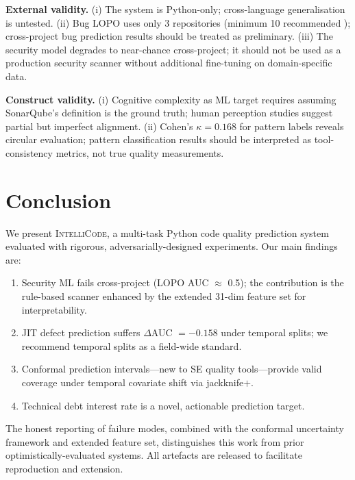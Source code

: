 \documentclass[conference]{IEEEtran}
\begin{document}
\textbf{External validity.}
(i) The system is Python-only; cross-language generalisation is untested.
(ii) Bug LOPO uses only 3 repositories (minimum 10 recommended \cite{peters2013});
cross-project bug prediction results should be treated as preliminary.
(iii) The security model degrades to near-chance cross-project; it should
not be used as a production security scanner without additional fine-tuning
on domain-specific data.

\textbf{Construct validity.}
(i) Cognitive complexity as ML target requires assuming SonarQube's definition
is the ground truth; human perception studies \cite{scalabrino2017} suggest
partial but imperfect alignment.
(ii) Cohen's $\kappa = 0.168$ for pattern labels reveals circular evaluation;
pattern classification results should be interpreted as tool-consistency
metrics, not true quality measurements.

\section{Conclusion}
\label{sec:conclusion}

We present \textsc{IntelliCode}, a multi-task Python code quality prediction
system evaluated with rigorous, adversarially-designed experiments.
Our main findings are:
\begin{enumerate}
  \item Security ML fails cross-project (LOPO AUC $\approx$ 0.5); the
    contribution is the rule-based scanner enhanced by the extended 31-dim
    feature set for interpretability.
  \item JIT defect prediction suffers $\Delta$AUC $= -0.158$ under temporal
    splits; we recommend temporal splits as a field-wide standard.
  \item Conformal prediction intervals---new to SE quality tools---provide
    valid coverage under temporal covariate shift via jackknife$+$.
  \item Technical debt interest rate is a novel, actionable prediction target.
\end{enumerate}

The honest reporting of failure modes, combined with the conformal uncertainty
framework and extended feature set, distinguishes this work from prior
optimistically-evaluated systems.
All artefacts are released to facilitate reproduction and extension.



\end{document}
